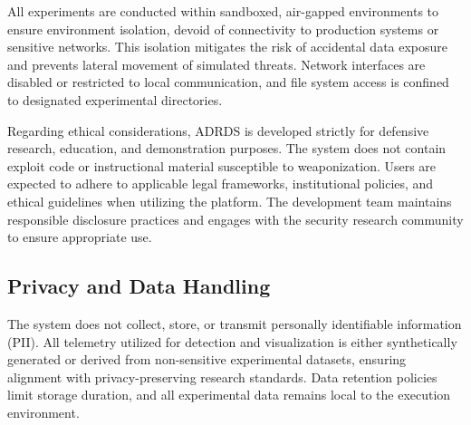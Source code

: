 All experiments are conducted within sandboxed, air-gapped environments to ensure environment isolation, devoid of connectivity to production systems or sensitive networks. This isolation mitigates the risk of accidental data exposure and prevents lateral movement of simulated threats. Network interfaces are disabled or restricted to local communication, and file system access is confined to designated experimental directories.

Regarding ethical considerations, ADRDS is developed strictly for defensive research, education, and demonstration purposes. The system does not contain exploit code or instructional material susceptible to weaponization. Users are expected to adhere to applicable legal frameworks, institutional policies, and ethical guidelines when utilizing the platform. The development team maintains responsible disclosure practices and engages with the security research community to ensure appropriate use.

\subsection{Privacy and Data Handling}

The system does not collect, store, or transmit personally identifiable information (PII). All telemetry utilized for detection and visualization is either synthetically generated or derived from non-sensitive experimental datasets, ensuring alignment with privacy-preserving research standards. Data retention policies limit storage duration, and all experimental data remains local to the execution environment.
